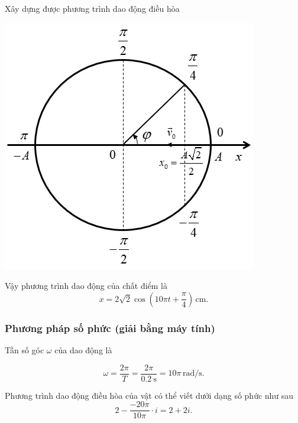 \begin{dang}{Xây dựng được phương trình dao động điều hòa}
{		\begin{center}
			\includegraphics[scale=0.8]{../figs/VN12-PH-02-A-001-1-V2-8.jpg}
		\end{center}
		
		Vậy phương trình dao động của chất điểm là
		\begin{equation*}
			x=2\sqrt{2}\cos\left(10\pi t+\dfrac{\pi}{4} \right)\,\text{cm}.
		\end{equation*}
		
		\subsubsection{Phương pháp số phức (giải bằng máy tính)}
		
		Tần số góc $\omega$ của dao động là
		
		\begin{equation*}
			\omega =\frac{2\pi }{T}=\frac{2\pi }{\SI{0,2}{\second}}=10\pi \,\text{rad/s}.
		\end{equation*}
		
		Phương trình dao động điều hòa của vật có thể viết dưới dạng số phức như sau
		\begin{equation*}
			2-\dfrac{-20\pi}{10\pi}\cdot i=2+2i.
		\end{equation*}
		
}
\end{dang}
